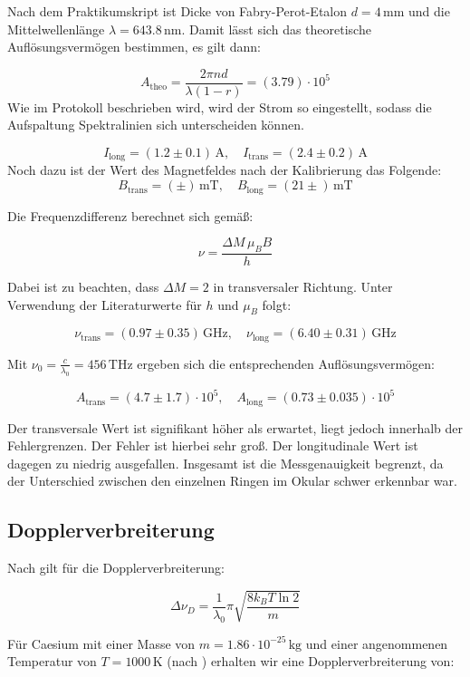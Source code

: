 \documentclass{article}
\begin{document}
\begin{multicols}{2}
Nach dem Praktikumskript ist Dicke von Fabry-Perot-Etalon 
$d = 4 \, \text{mm}$ und die Mittelwellenlänge $\lambda = 643.8 \, \text{nm}$.
Damit lässt sich das theoretische Auflösungsvermögen bestimmen, es gilt dann:

\[
A_{\text{theo}} = \frac{2 \pi n d}{\lambda (1 - r)} = (3.79) \cdot 10^5
\]
Wie im Protokoll beschrieben wird, wird der Strom so eingestellt, sodass die Aufspaltung
Spektralinien sich unterscheiden können.

\[
I_{\text{long}} = (1.2 \pm 0.1) \, \text{A}, \quad I_{\text{trans}} = (2.4 \pm 0.2) \, \text{A}
\]
Noch dazu ist der Wert des Magnetfeldes nach der Kalibrierung das Folgende: 
\[
B_{\text{trans}} = ( \pm ) \, \text{mT}, \quad B_{\text{long}} = (21 \pm ) \, \text{mT}
\]

Die Frequenzdifferenz berechnet sich gemäß:

\[
\nu = \frac{\Delta M \, \mu_B B}{h}
\]

Dabei ist zu beachten, dass $\Delta M = 2$ in transversaler Richtung. Unter Verwendung der 
Literaturwerte für $h$ und $\mu_B$  folgt:

\[
\nu_{\text{trans}} = (0.97 \pm 0.35) \, \text{GHz}, \quad \nu_{\text{long}} = (6.40 \pm 0.31) \, \text{GHz}
\]

Mit $\nu_0 = \frac{c}{\lambda_0} = 456 \, \text{THz}$ ergeben sich die entsprechenden Auflösungsvermögen:

\[
A_{\text{trans}} = (4.7 \pm 1.7) \cdot 10^5, \quad A_{\text{long}} = (0.73 \pm 0.035) \cdot 10^5
\]

Der transversale Wert ist signifikant höher als erwartet, liegt jedoch innerhalb der Fehlergrenzen. Der Fehler ist hierbei sehr groß. Der longitudinale Wert ist dagegen zu niedrig ausgefallen. Insgesamt ist die Messgenauigkeit begrenzt, da der Unterschied zwischen den einzelnen Ringen im Okular schwer erkennbar war.

\subsection{Dopplerverbreiterung}

Nach \cite{} gilt für die Dopplerverbreiterung:

\[
\Delta \nu_D = \frac{1}{\lambda_0} \pi \sqrt{\frac{8 k_B T \ln 2}{m}}
\]

Für Caesium mit einer Masse von $m = 1.86 \cdot 10^{-25} \, \text{kg}$ und einer angenommenen Temperatur von $T = 1000 \, \text{K}$ (nach \cite{source11}) erhalten wir eine Dopplerverbreiterung von:


\end{multicols}
\end{document}

